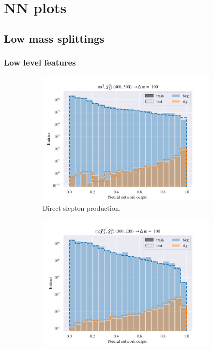 \chapter{NN plots}
\label{sec:appNNplots}

\newpage

\section{Low mass splittings}

\subsection{Low level features}

\begin{figure}[H]
    \centering
    \begin{subfigure}[t!]{0.49\textwidth}
        \includegraphics[width = \textwidth]{Figures/SlepSlep/ML/NN/Low_level/Low/scaled_train_test_395984.pdf}
        \caption{Direct slepton production.}
        \label{fig:}
    \end{subfigure}
    \begin{subfigure}[t!]{0.49\textwidth}
        \includegraphics[width = \textwidth]{Figures/SlepSnu/NN/Low_level/Low/scaled_train_test_397115.pdf}

\end{subfigure}
\end{figure}
